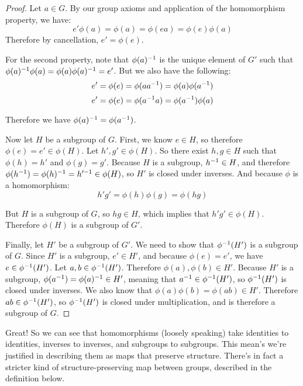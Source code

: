 \begin{proof}
Let $a \in G$. By our group axioms and application of the homomorphism property, we have:
\begin{equation*}
    e'\phi(a) = \phi(a) = \phi(ea) = \phi(e)\phi(a)
\end{equation*}
Therefore by cancellation, $e' = \phi(e)$.

For the second property, note that $\phi(a)^{-1}$ is the unique element of $G'$ such that $\phi(a)^{-1}\phi(a) = \phi(a)\phi(a)^{-1} = e'$. But we also have the following:
\begin{equation*}
    e' = \phi(e) = \phi(aa^{-1}) = \phi(a)\phi(a^{-1})
\end{equation*}
\begin{equation*}
    e' = \phi(e) = \phi(a^{-1} a) = \phi(a^{-1})\phi(a)
\end{equation*}

Therefore we have $\phi(a)^{-1} = \phi(a^{-1})$.

Now let $H$ be a subgroup of $G$. First, we know $e \in H$, so therefore $\phi(e) = e' \in \phi(H)$. Let $h', g' \in \phi(H)$. So there exist $h, g \in H$ such that $\phi(h) = h'$ and $\phi(g) = g'$. Because $H$ is a subgroup, $h^{-1} \in H$, and therefore $\phi(h^{-1}) = \phi(h)^{-1} = h'^{-1} \in \phi(H)$, so $H'$ is closed under inverses. And because $\phi$ is a homomorphism:
\begin{equation*}
    h'g' = \phi(h)\phi(g) = \phi(hg)
\end{equation*}

But $H$ is a subgroup of $G$, so $hg \in H$, which implies that $h'g' \in \phi(H)$. Therefore $\phi(H)$ is a subgroup of $G'$.

Finally, let $H'$ be a subgroup of $G'$. We need to show that $\phi^{-1} (H')$ is a subgroup of $G$. Since $H'$ is a subgroup, $e' \in H'$, and because $\phi(e) = e'$, we have $e \in \phi^{-1}(H')$. Let $a, b \in \phi^{-1}(H')$. Therefore $\phi(a), \phi(b) \in H'$. Because $H'$ is a subgroup, $\phi(a^{-1}) = \phi(a)^{-1} \in H'$, meaning that $a^{-1} \in \phi^{-1}(H')$, so $\phi^{-1}(H')$ is closed under inverses. We also know that $\phi(a)\phi(b) = \phi(ab) \in H'$. Therefore $ab \in \phi^{-1}(H')$, so $\phi^{-1}(H')$ is closed under multiplication, and is therefore a subgroup of $G$.

\end{proof}

Great! So we can see that homomorphisms (loosely speaking) take identities to identities, inverses to inverses, and subgroups to subgroups. This mean's we're justified in describing them as maps that preserve structure. There's in fact a stricter kind of structure-preserving map between groups, described in the definition below.

